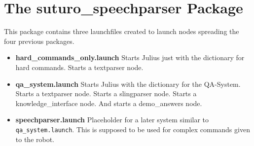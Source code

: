 \documentclass[main.tex]{subfiles}
\begin{document}
    
\section{The suturo\_speechparser Package}
    This package contains three launchfiles created to launch nodes spreading the four previous packages.\\
    \begin{itemize}
        \item \textbf{hard\_commands\_only.launch}
            \subitem Starts Julius just with the dictionary for hard commands.
            \subitem Starts a textparser node.
        \item \textbf{qa\_system.launch}
            \subitem Starts Julius with the dictionary for the QA-System.
            \subitem Starts a textparser node.
            \subitem Starts a slingparser node.
            \subitem Starts a knowledge\_interface node.
            \subitem And starts a demo\_answers node.        
        \item \textbf{speechparser.launch}
            \subitem Placeholder for a later system similar to \texttt{qa\_system.launch}. This is supposed to be used for complex commands given to the robot.  
        
    \end{itemize}
     \newpage
    	
\end{document}
